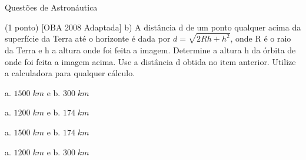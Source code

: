 \documentclass{../lista}
\begin{document}
\begin{secao}{Questões de Astronáutica}
\begin{questao}{(1 ponto) [OBA 2008 Adaptada]}
			b) A distância d de um ponto qualquer acima da superfície da Terra até o horizonte é dada por $d = \sqrt{2 R h + h^{2}}$, onde R é o raio da Terra e h a altura onde foi feita a imagem. Determine a altura h da órbita de onde foi feita a imagem acima. Use a distância d obtida no item anterior. Utilize a calculadora para qualquer cálculo.
			
			\begin{alternativas}
				\item a. $1500 \; km$ e b. $300 \; km$
				\item a. $1200 \; km$ e b. $174 \; km$
				\item a. $1500 \; km$ e b. $174 \; km$
				\item a. $1200 \; km$ e b. $300 \; km$
			\end{alternativas}
		\end{questao}


\end{secao}
\end{document}

